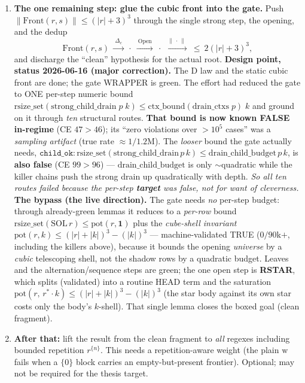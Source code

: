 \documentclass[11pt]{article}
\newcommand{\rs}[1]{\lvert #1\rvert}                  %
\newcommand{\norm}[1]{\lVert #1\rVert}                %
\newcommand{\zw}{\mathrm{w}}                           %
\newcommand{\Front}{\mathrm{Front}}                    %
\newcommand{\Strong}{\Delta}                           %
\newcommand{\Open}{\mathrm{Open}}                      %
\newcommand{\now}{\textcolor{blue}{\textbf{[$\rightarrow$ CURRENT]}}}
\newcommand{\todo}{\textcolor{gray}{\textbf{[$\circ$ LATER]}}}
\begin{document}
\begin{enumerate}[leftmargin=2.2em,itemsep=6pt]
\item[\now] \textbf{The one remaining step: glue the cubic front into the gate.}
Push $\norm{\Front(r,s)}\le(\rs{r}+3)^3$ through the single strong step, the
opening, and the dedup
\[
\Front(r,s)\ \xrightarrow{\ \Strong_c\ }\ \cdot\ \xrightarrow{\ \Open\ }\ \cdot
\ \xrightarrow{\ \norm{\,\cdot\,}\ }\ \le\ 2(\rs{r}+3)^3,
\]
and discharge the ``clean'' hypothesis for the actual root.
\textbf{Design point, status 2026-06-16 (major correction).} The D law and the static
cubic front are done; the gate WRAPPER is green. The effort had reduced the gate to ONE
per-step numeric bound $\mathrm{rsize\_set}(\mathrm{strong\_child\_drain}\;p\;k)\le
\mathrm{ctx\_bound}(\mathrm{drain\_ctxs}\;p)\;k$ and ground on it through \emph{ten}
structural routes. \textbf{That bound is now known FALSE in-regime} (CE $47>46$); its
``zero violations over $>\!10^{5}$ cases'' was a \emph{sampling artifact} (true rate
${\approx}1/1.2$M). The \emph{looser} bound the gate actually needs, $\texttt{child\_ok}:
\mathrm{rsize\_set}(\mathrm{strong\_child\_drain}\,p\,k)\le\mathrm{drain\_child\_budget}\,p\,k$,
is \textbf{also false} (CE $99>96$) --- $\mathrm{drain\_child\_budget}$ is only
${\sim}$quadratic while the killer chains push the strong drain up quadratically with depth.
\emph{So all ten routes failed because the per-step \textbf{target} was false, not for want
of cleverness.}
\textbf{The bypass (the live direction).} The gate needs \emph{no} per-step budget: through
already-green lemmas it reduces to a \emph{per-row} bound
$\mathrm{rsize\_set}(\mathrm{SOL}\,r)\le\mathrm{pot}(r,\mathbf 1)$ plus the \emph{cube-shell
invariant} $\mathrm{pot}(r,k)\le(\rs r+\rs k)^3-(\rs k)^3$ --- machine-validated TRUE
($0/90$k$+$, including the killers above), because it bounds the opening \emph{universe} by a
\emph{cubic} telescoping shell, not the shadow rows by a quadratic budget. Leaves and the
alternation/sequence steps are green; the one open step is \textbf{RSTAR}, which splits (validated)
into a routine HEAD term and the saturation $\mathrm{pot}(r,\,r^{*}\!\cdot k)\le(\rs
r+\rs k)^3-(\rs k)^3$ (the star body against its own star costs only the body's $k$-shell).
That single lemma closes the boxed goal (clean fragment).

\item[\todo] \textbf{After that:} lift the result from the clean fragment to
\emph{all} regexes including bounded repetition $r^{\{n\}}$. This needs a
repetition-aware weight (the plain $\zw$ fails when a $\{0\}$ block carries an
empty-but-present frontier). Optional; may not be required for the thesis target.

\end{enumerate}
\end{document}
